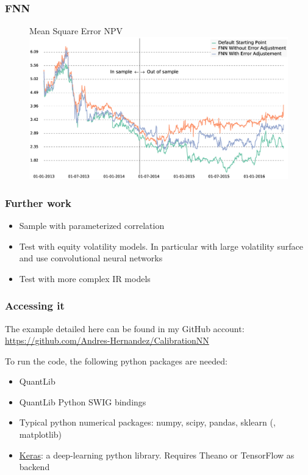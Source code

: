 \documentclass[bigger]{beamer}
\begin{document}
\begin{frame}
\frametitle{FNN}
  \justifying
\begin{figure}[h]
\centering
   Mean Square Error NPV\\
   \includegraphics[width=\textwidth]{Graphics/npv_error_fnn_unadj_vs_adj_error.eps}
\end{figure}
\end{frame}

\begin{frame}
\frametitle{Further work}
  \justifying

\begin{itemize}
\item Sample with parameterized correlation
\item Test with equity volatility models. In particular with large volatility surface and use convolutional neural networks
\item Test with more complex IR models
\end{itemize}
\end{frame}

\begin{frame}
\frametitle{Accessing it}
  \justifying
The example detailed here can be found in my GitHub account:
\url{https://github.com/Andres-Hernandez/CalibrationNN}

To run the code, the following python packages are needed:
\begin{itemize}
\item QuantLib
\item QuantLib Python SWIG bindings
\item Typical python numerical packages: numpy, scipy, pandas, sklearn (, matplotlib)
\item \href{http://keras.io/}{Keras}: a deep-learning python library. Requires Theano or TensorFlow as backend
\end{itemize}
\end{frame}
\end{document}
